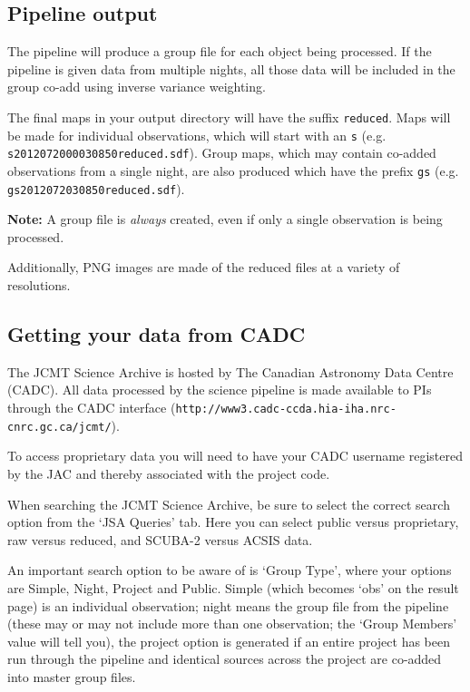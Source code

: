 \documentclass[twoside,11pt]{article}
\newcommand{\xlabel}[1]{}
\renewcommand{\_}{\texttt{\symbol{95}}}
\begin{document}
\subsection{\xlabel{pl_output}Pipeline output}

The pipeline will produce a group file for each object being
processed. If the pipeline is given data from multiple nights, all
those data will be included in the group co-add using inverse variance
weighting.

The final maps in your output directory will have the suffix
\texttt{\_reduced}. Maps will be made for individual observations,
which will start with an \texttt{s} (e.g.
\texttt{s20120720\_00030\_850\_reduced.sdf}). Group maps, which may contain
co-added observations from a single night, are also produced which
have the prefix \texttt{gs} (e.g. \texttt{gs20120720\_30\_850\_reduced.sdf}).

\textbf{Note:} A group file is \emph{always} created, even if only a single
observation is being processed.

Additionally, PNG images are made of the reduced files at a variety of
resolutions.

\subsection{\xlabel{cadc}Getting your data from CADC}

The JCMT Science Archive is hosted by The Canadian Astronomy Data
Centre (CADC). All data processed by the science pipeline is made
available to PIs through the CADC interface
(\texttt{http://www3.cadc-ccda.hia-iha.nrc-cnrc.gc.ca/jcmt/}).

To access proprietary data you will need to have your CADC username
registered by the JAC and thereby associated with the project code.

When searching the JCMT Science Archive, be sure to select the correct
search option from the `JSA Queries' tab. Here you can select public
versus proprietary, raw versus reduced, and SCUBA-2 versus ACSIS data.

An important search option to be aware of is `Group Type', where your
options are Simple, Night, Project and Public. Simple (which becomes
`obs' on the result page) is an individual observation; night means
the group file from the pipeline (these may or may not include more
than one observation; the `Group Members' value will tell you), the
project option is generated if an entire project has been run through
the pipeline and identical sources across the project are co-added
into master group files.
\end{document}
